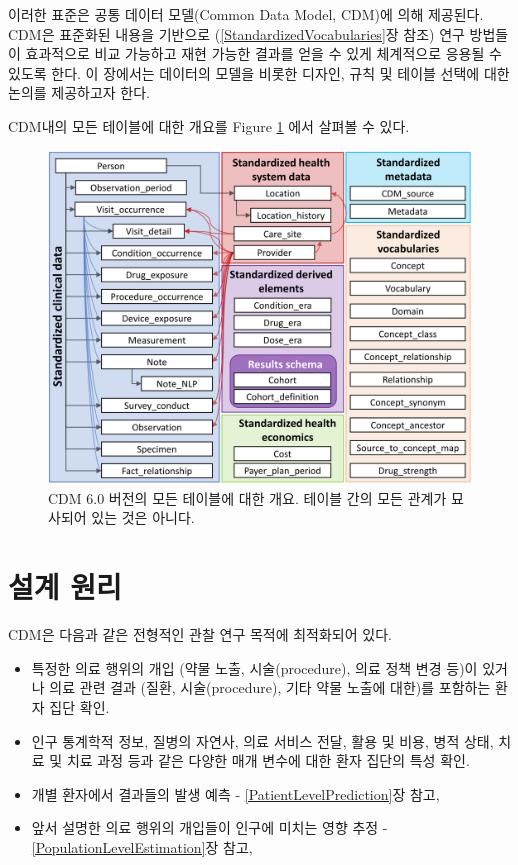\documentclass[11pt]{book}
\providecommand{\tightlist}{%
  \setlength{\itemsep}{0pt}\setlength{\parskip}{0pt}}
\theoremstyle{definition}
\theoremstyle{definition}
\theoremstyle{definition}
\theoremstyle{remark}
\begin{document}
이러한 표준은 공통 데이터 모델(Common Data Model, CDM)에 의해 제공된다.
CDM은 표준화된 내용을 기반으로 (\ref{StandardizedVocabularies}장 참조)
연구 방법들이 효과적으로 비교 가능하고 재현 가능한 결과를 얻을 수 있게
체계적으로 응용될 수 있도록 한다. 이 장에서는 데이터의 모델을 비롯한
디자인, 규칙 및 테이블 선택에 대한 논의를 제공하고자 한다.

CDM내의 모든 테이블에 대한 개요를 Figure \ref{fig:cdmDiagram}
에서 살펴볼 수 있다.

\begin{figure}
\includegraphics[width=1\linewidth]{images/CommonDataModel/cdmDiagram} \caption{CDM 6.0 버전의 모든 테이블에 대한 개요. 테이블 간의 모든 관계가 묘사되어 있는 것은 아니다.}\label{fig:cdmDiagram}
\end{figure}

\section{설계 원리}\label{-}

CDM은 다음과 같은 전형적인 관찰 연구 목적에 최적화되어
있다.

\begin{itemize}
\tightlist
\item
  특정한 의료 행위의 개입 (약물 노출, 시술(procedure), 의료 정책 변경
  등)이 있거나 의료 관련 결과 (질환, 시술(procedure), 기타 약물 노출에
  대한)를 포함하는 환자 집단 확인.
\item
  인구 통계학적 정보, 질병의 자연사, 의료 서비스 전달, 활용 및 비용,
  병적 상태, 치료 및 치료 과정 등과 같은 다양한 매개 변수에 대한 환자
  집단의 특성 확인.
\item
  개별 환자에서 결과들의 발생 예측 - \ref{PatientLevelPrediction}장
  참고,
\item
  앞서 설명한 의료 행위의 개입들이 인구에 미치는 영향 추정 -
  \ref{PopulationLevelEstimation}장 참고,
\end{itemize}
\end{document}
